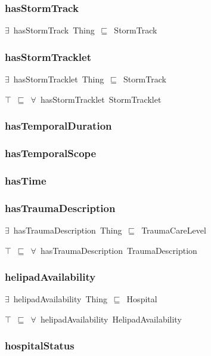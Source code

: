 \documentclass{article}
\begin{document}
\subsubsection*{hasStormTrack}

\ensuremath{\exists}~hasStormTrack~Thing~\ensuremath{\sqsubseteq}~StormTrack

\subsubsection*{hasStormTracklet}

\ensuremath{\exists}~hasStormTracklet~Thing~\ensuremath{\sqsubseteq}~StormTrack

\ensuremath{\top}~\ensuremath{\sqsubseteq}~\ensuremath{\forall}~hasStormTracklet~StormTracklet

\subsubsection*{hasTemporalDuration}

\subsubsection*{hasTemporalScope}

\subsubsection*{hasTime}

\subsubsection*{hasTraumaDescription}

\ensuremath{\exists}~hasTraumaDescription~Thing~\ensuremath{\sqsubseteq}~TraumaCareLevel

\ensuremath{\top}~\ensuremath{\sqsubseteq}~\ensuremath{\forall}~hasTraumaDescription~TraumaDescription

\subsubsection*{helipadAvailability}

\ensuremath{\exists}~helipadAvailability~Thing~\ensuremath{\sqsubseteq}~Hospital

\ensuremath{\top}~\ensuremath{\sqsubseteq}~\ensuremath{\forall}~helipadAvailability~HelipadAvailability

\subsubsection*{hospitalStatus}
\end{document}
